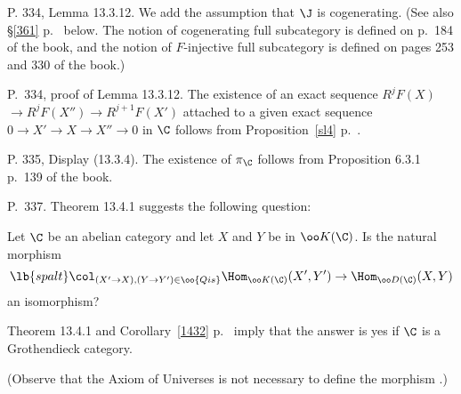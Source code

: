 \documentclass[12pt]{article}
\theoremstyle{remark}
\theoremstyle{definition}
\begin{document}
%

\begin{s}
P. 334, Lemma 13.3.12. We add the assumption that $\J$ is cogenerating. (See also \S\ref{361} p.~ below. The notion of cogenerating full subcategory is defined on p.~184 of the book, and the notion of $F$-injective full subcategory is defined on pages 253 and 330 of the book.)
\end{s}

%

\begin{s}
P.~334, proof of Lemma 13.3.12. %
The existence of an exact sequence $R^jF(X)$ $\to R^jF(X'')\to R^{j+1}F(X')$ attached to a given exact sequence $0\to X'\to X\to X''\to0$ in $\C$ follows from Proposition~\ref{sl4} p.~.
\end{s}

%

\begin{s}
P. 335, Display (13.3.4). The existence of $\pi_\C$ follows from Proposition 6.3.1 p.~139 of the book.
\end{s}

%

\begin{s}
P.~337. Theorem 13.4.1 suggests the following question: 

Let $\C$ be an abelian category and let $X$ and $Y$ be in $\oo K(\C)$. Is the natural morphism 
\begin{equation}\lb{spalt}
\col_{(X'\to X),(Y\to Y')\in\oo{Qis}}\Hom_{\oo K(\C)}(X',Y')\to\Hom_{\oo D(\C)}(X,Y)
\end{equation} 
an isomorphism?

Theorem 13.4.1 and Corollary~\ref{1432} p.~ imply that the answer is yes if $\C$ is a Grothendieck category. 

(Observe that the Axiom of Universes is not necessary to define the morphism .)
\end{s}

%
\end{document}
